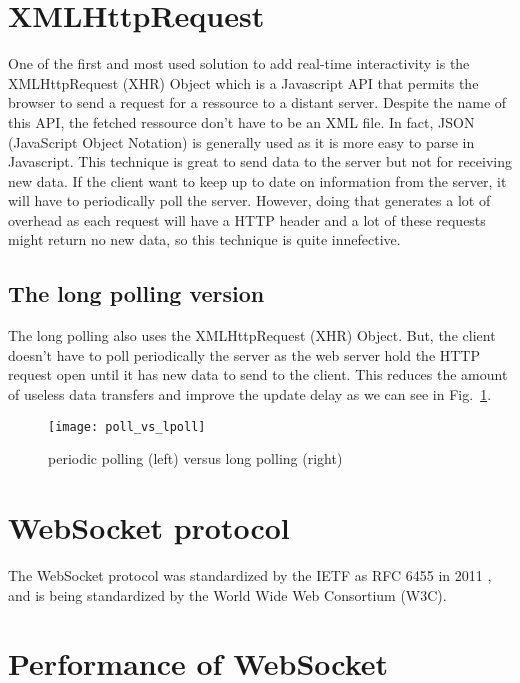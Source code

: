 \documentclass[journal,compsoc]{IEEEtran}
\newcommand{\ws}{WebSocket}
\begin{document}
\section{XMLHttpRequest}

One of the first and most used solution to add real-time interactivity is the XMLHttpRequest (XHR) Object which is a Javascript API that permits the browser to send a request for a ressource to a distant server.
Despite the name of this API, the fetched ressource don't have to be an XML file.
In fact, JSON (JavaScript Object Notation) is generally used as it is more easy to parse in Javascript.
This technique is great to send data to the server but not for receiving new data.
If the client want to keep up to date on information from the server, it will have to periodically poll the server.
However, doing  that generates a lot of overhead as each request will have a HTTP header and a lot of these requests might return no new data, so this technique is quite innefective.

\subsection{The long polling version}

The long polling also uses the XMLHttpRequest (XHR) Object.
But, the client doesn't have to poll periodically the server as the web server hold the HTTP request open until it has new data to send to the client.
This reduces the amount of useless data transfers and improve the update delay as we can see in Fig.~\ref{poll_vs_lpoll}.

\begin{figure}
  \centering
  \texttt{[image: poll\_vs\_lpoll]}
  \label{poll_vs_lpoll}
  \caption{periodic polling (left) versus long polling (right)}
\end{figure}

\section{\ws{} protocol}
The \ws{} protocol was standardized by the IETF as RFC 6455 in 2011 \cite{rfc6455}, and is being standardized by the World Wide Web Consortium (W3C).



\section{Performance of WebSocket}
\end{document}
